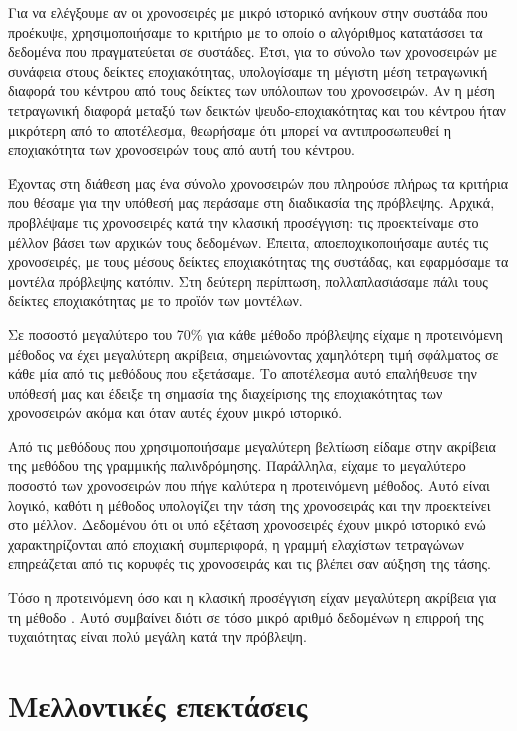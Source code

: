 Για να ελέγξουμε αν οι χρονοσειρές με μικρό ιστορικό ανήκουν στην συστάδα που προέκυψε, χρησιμοποιήσαμε το κριτήριο με το οποίο ο αλγόριθμος  κατατάσσει τα δεδομένα που πραγματεύεται σε συστάδες. Έτσι, για το σύνολο των χρονοσειρών με συνάφεια στους δείκτες εποχιακότητας, υπολογίσαμε τη μέγιστη μέση τετραγωνική διαφορά του κέντρου από τους δείκτες των υπόλοιπων του χρονοσειρών. Αν η μέση τετραγωνική διαφορά μεταξύ των δεικτών ψευδο-εποχιακότητας και του κέντρου ήταν μικρότερη από το αποτέλεσμα, θεωρήσαμε ότι μπορεί να αντιπροσωπευθεί η εποχιακότητα των χρονοσειρών τους από αυτή του κέντρου.

Έχοντας στη διάθεση μας ένα σύνολο χρονοσειρών που πληρούσε πλήρως τα κριτήρια που θέσαμε για την υπόθεσή μας περάσαμε στη διαδικασία της πρόβλεψης. Αρχικά, προβλέψαμε τις χρονοσειρές κατά την κλασική προσέγγιση: τις προεκτείναμε στο μέλλον βάσει των αρχικών τους δεδομένων. Έπειτα, αποεποχικοποιήσαμε αυτές τις χρονοσειρές, με τους μέσους δείκτες εποχιακότητας της συστάδας, και εφαρμόσαμε τα μοντέλα πρόβλεψης κατόπιν. Στη δεύτερη περίπτωση, πολλαπλασιάσαμε πάλι τους δείκτες εποχιακότητας με το προϊόν των μοντέλων.

Σε ποσοστό μεγαλύτερο του 70\% για κάθε μέθοδο πρόβλεψης είχαμε η προτεινόμενη μέθοδος να έχει μεγαλύτερη ακρίβεια, σημειώνοντας χαμηλότερη τιμή σφάλματος σε κάθε μία από τις μεθόδους που εξετάσαμε. Το αποτέλεσμα αυτό επαλήθευσε την υπόθεσή μας και έδειξε τη σημασία της διαχείρισης της εποχιακότητας των χρονοσειρών ακόμα και όταν αυτές έχουν μικρό ιστορικό.

Από τις μεθόδους που χρησιμοποιήσαμε μεγαλύτερη βελτίωση είδαμε στην ακρίβεια της μεθόδου της γραμμικής παλινδρόμησης. Παράλληλα, είχαμε το μεγαλύτερο ποσοστό των χρονοσειρών που πήγε καλύτερα η προτεινόμενη μέθοδος.  Αυτό είναι λογικό, καθότι η μέθοδος υπολογίζει την τάση της χρονοσειράς και την προεκτείνει στο μέλλον. Δεδομένου ότι οι υπό εξέταση χρονοσειρές έχουν μικρό ιστορικό ενώ χαρακτηρίζονται από εποχιακή συμπεριφορά, η γραμμή ελαχίστων τετραγώνων επηρεάζεται από τις κορυφές τις χρονοσειράς και τις βλέπει σαν αύξηση της τάσης. 

Τόσο η προτεινόμενη όσο και η κλασική προσέγγιση είχαν μεγαλύτερη ακρίβεια για τη μέθοδο . Αυτό συμβαίνει διότι σε τόσο μικρό αριθμό δεδομένων η επιρροή της τυχαιότητας είναι πολύ μεγάλη κατά την πρόβλεψη.

\section{Μελλοντικές επεκτάσεις}

